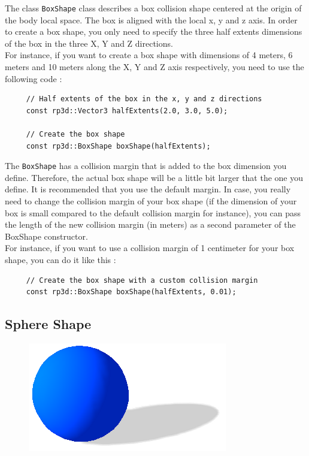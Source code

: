 \documentclass[a4paper,12pt]{article}
\begin{document}
    The class \texttt{BoxShape} class describes a box collision shape centered at the origin of the body local space. The box is aligned with the local x, y and z axis.
    In order to create a box shape, you only need to specify the three half extents dimensions of the box in the three X, Y and Z directions. \\

    For instance, if you want to create a box shape with dimensions of 4 meters, 6 meters and 10 meters along the X, Y and Z axis respectively, you need to use the following code : \\

    \begin{lstlisting}
     // Half extents of the box in the x, y and z directions
     const rp3d::Vector3 halfExtents(2.0, 3.0, 5.0);

     // Create the box shape
     const rp3d::BoxShape boxShape(halfExtents);
  \end{lstlisting}

    \vspace{0.6cm}

    The \texttt{BoxShape} has a collision margin that is added to the box dimension you define. Therefore, the actual box shape will be a little bit larger that the one you define.
    It is recommended that you use the default margin. In case, you really need to change the collision margin of your box shape (if the dimension of your box is small compared
    to the default collision margin for instance), you can pass the length of the new collision margin (in meters) as a second parameter of the BoxShape constructor. \\

    For instance, if you want to use a collision margin of 1 centimeter for your box shape, you can do it like this : \\

   \begin{lstlisting}
     // Create the box shape with a custom collision margin
     const rp3d::BoxShape boxShape(halfExtents, 0.01);
  \end{lstlisting}

    \subsection{Sphere Shape}

    \begin{figure}[h]
        \centering
        \includegraphics{sphereshape.png}
        \label{fig:sphereshape}
    \end{figure}
\end{document}
